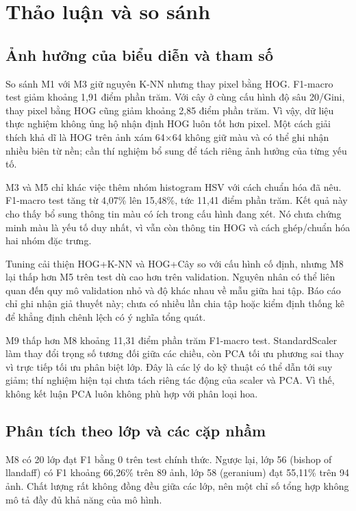 \section{Thảo luận và so sánh}
\subsection{Ảnh hưởng của biểu diễn và tham số}

So sánh M1 với M3 giữ nguyên K-NN nhưng thay pixel bằng HOG. F1-macro test giảm khoảng 1,91 điểm phần trăm. Với cây ở cùng cấu hình độ sâu 20/Gini, thay pixel bằng HOG cũng giảm khoảng 2,85 điểm phần trăm. Vì vậy, dữ liệu thực nghiệm không ủng hộ nhận định HOG luôn tốt hơn pixel. Một cách giải thích khả dĩ là HOG trên ảnh xám 64\(\times\)64 không giữ màu và có thể ghi nhận nhiều biên từ nền; cần thí nghiệm bổ sung để tách riêng ảnh hưởng của từng yếu tố.

M3 và M5 chỉ khác việc thêm nhóm histogram HSV với cách chuẩn hóa đã nêu. F1-macro test tăng từ 4,07\% lên 15,48\%, tức 11,41 điểm phần trăm. Kết quả này cho thấy bổ sung thông tin màu có ích trong cấu hình đang xét. Nó chưa chứng minh màu là yếu tố duy nhất, vì vẫn còn thông tin HOG và cách ghép/chuẩn hóa hai nhóm đặc trưng.

Tuning cải thiện HOG+K-NN và HOG+Cây so với cấu hình cố định, nhưng M8 lại thấp hơn M5 trên test dù cao hơn trên validation. Nguyên nhân có thể liên quan đến quy mô validation nhỏ và độ khác nhau về mẫu giữa hai tập. Báo cáo chỉ ghi nhận giả thuyết này; chưa có nhiều lần chia tập hoặc kiểm định thống kê để khẳng định chênh lệch có ý nghĩa tổng quát.

M9 thấp hơn M8 khoảng 11,31 điểm phần trăm F1-macro test. StandardScaler làm thay đổi trọng số tương đối giữa các chiều, còn PCA tối ưu phương sai thay vì trực tiếp tối ưu phân biệt lớp. Đây là các lý do kỹ thuật có thể dẫn tới suy giảm; thí nghiệm hiện tại chưa tách riêng tác động của scaler và PCA. Vì thế, không kết luận PCA luôn không phù hợp với phân loại hoa.

\subsection{Phân tích theo lớp và các cặp nhầm}
M8 có 20 lớp đạt F1 bằng 0 trên test chính thức. Ngược lại, lớp 56 (bishop of llandaff) có F1 khoảng 66,26\% trên 89 ảnh, lớp 58 (geranium) đạt 55,11\% trên 94 ảnh. Chất lượng rất không đồng đều giữa các lớp, nên một chỉ số tổng hợp không mô tả đầy đủ khả năng của mô hình.

